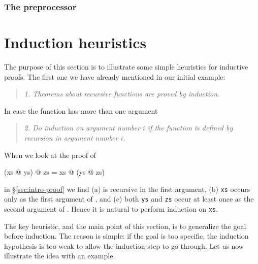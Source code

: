 \subsubsection{The preprocessor}

\section{Induction heuristics}
\label{sec:InductionHeuristics}

The purpose of this section is to illustrate some simple heuristics for
inductive proofs. The first one we have already mentioned in our initial
example:
\begin{quote}
{\em 1. Theorems about recursive functions are proved by induction.}
\end{quote}
In case the function has more than one argument
\begin{quote}
{\em 2. Do induction on argument number $i$ if the function is defined by
recursion in argument number $i$.}
\end{quote}
When we look at the proof of
\begin{ttbox}\makeatother
(xs @ ys) @ zs = xs @ (ys @ zs)
\end{ttbox}
in \S\ref{sec:intro-proof} we find (a) \texttt{\at} is recursive in the first
argument, (b) \texttt{xs} occurs only as the first argument of \texttt{\at},
and (c) both \texttt{ys} and \texttt{zs} occur at least once as the second
argument of \texttt{\at}. Hence it is natural to perform induction on
\texttt{xs}.

The key heuristic, and the main point of this section, is to
generalize the goal before induction. The reason is simple: if the goal is
too specific, the induction hypothesis is too weak to allow the induction
step to go through. Let us now illustrate the idea with an example.

